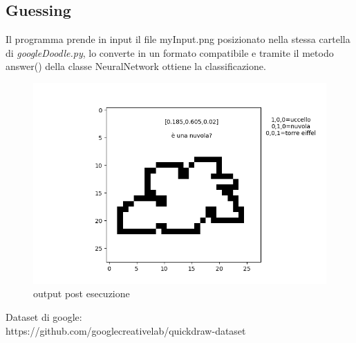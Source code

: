 \documentclass[12pt]{article}
\begin{document}
\subsection{Guessing}
Il programma prende in input il file myInput.png posizionato nella stessa cartella di \textit{googleDoodle.py}, lo converte in un formato compatibile e tramite il metodo answer() della classe NeuralNetwork ottiene la classificazione.
\begin{figure}[h!]
	\centering
	\includegraphics[width=15 cm]{output.png}
	\caption{output post esecuzione}
	\label{fig:procOutput}
\end{figure}
\newpage
\begin{thebibliography}{9}
Dataset di google:\\
https://github.com/googlecreativelab/quickdraw-dataset 
\end{thebibliography}
\end{document}
